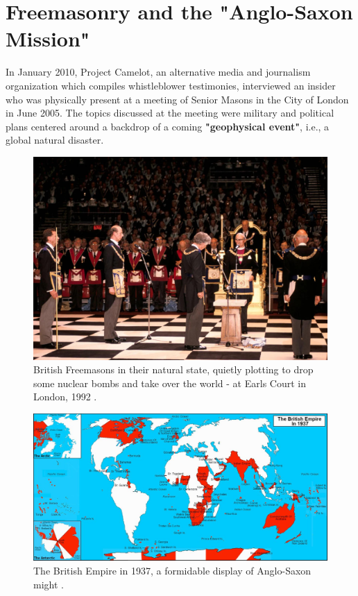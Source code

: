 \documentclass[10pt,twocolumn,letterpaper]{article}
\begin{document}
\section{Freemasonry and the "Anglo-Saxon Mission"}

In January 2010, Project Camelot, an alternative media and journalism organization which compiles whistleblower testimonies, interviewed \cite{4,6} an insider who was physically present at a meeting of Senior Masons in the City of London in June 2005. The topics discussed at the meeting were military and political plans centered around a backdrop of a coming \textbf{"geophysical event"}, i.e., a global natural disaster.

\begin{figure}[b]
\begin{center}
   \includegraphics[width=1\linewidth]{freemason.jpg}
\end{center}
   \caption{British Freemasons in their natural state, quietly plotting to drop some nuclear bombs and take over the world - at Earls Court in London, 1992 \cite{5}.}
\label{fig:1}
\label{fig:onecol}
\end{figure}

\begin{figure}[t]
\begin{center}
\includegraphics[width=1\textwidth]{british.jpg}
\end{center}
   \caption{The British Empire in 1937, a formidable display of Anglo-Saxon might \cite{14}.}
   \label{fig:2}
\end{figure}
\end{document}
